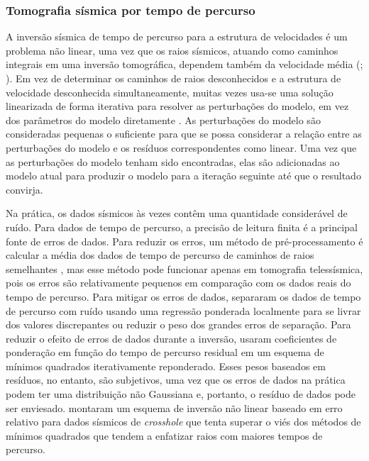 \documentclass[a4paper, 12 pt]{article} %
\begin{document}
\subsubsection{Tomografia sísmica por tempo de percurso}

A inversão sísmica de tempo de percurso para a estrutura de velocidades é um problema não linear, uma vez que os raios sísmicos, atuando como caminhos integrais em uma inversão tomográfica, dependem também da velocidade média (\citealp{worthington1984introduction}; \citealp{zhou2003crosshole}). Em vez de determinar os caminhos de raios desconhecidos e a estrutura de velocidade desconhecida simultaneamente, muitas vezes usa-se uma solução linearizada de forma iterativa para resolver as perturbações do modelo, em vez dos parâmetros do modelo diretamente \citep{bording1987applications}. As perturbações do modelo são consideradas pequenas o suficiente para que se possa considerar a relação entre as perturbações do modelo e os resíduos correspondentes como linear. Uma vez que as perturbações do modelo tenham sido encontradas, elas são adicionadas ao modelo atual para produzir o modelo para a iteração seguinte até que o resultado convirja.

Na prática, os dados sísmicos às vezes contêm uma quantidade considerável de ruído. Para dados de tempo de percurso, a precisão de leitura finita é a principal fonte de erros de dados. Para reduzir os erros, um método de pré-processamento é calcular a média dos dados de tempo de percurso de caminhos de raios semelhantes \cite{rohm2000effects}, mas esse método pode funcionar apenas em tomografia telessísmica, pois os erros são relativamente pequenos em comparação com os dados reais do tempo de percurso. Para mitigar os erros de dados, \cite{wang2000seismic} separaram os dados de tempo de percurso com ruído usando uma regressão ponderada localmente para se livrar dos valores discrepantes ou reduzir o peso dos grandes erros de separação. Para reduzir o efeito de erros de dados durante a inversão, \cite{scales1988fast} usaram coeficientes de ponderação em função do tempo de percurso residual em um esquema de mínimos quadrados iterativamente reponderado. Esses pesos baseados em resíduos, no entanto, são subjetivos, uma vez que os erros de dados na prática podem ter uma distribuição não Gaussiana e, portanto, o resíduo de dados pode ser enviesado. \cite{cao1995relative} montaram um esquema de inversão não linear baseado em erro relativo para dados sísmicos de \textit{crosshole} que tenta superar o viés dos métodos de mínimos quadrados que tendem a enfatizar raios com maiores tempos de percurso.
\end{document}
